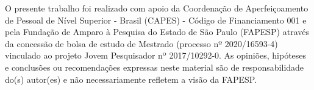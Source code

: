 \begin{agradecimentos}
O presente trabalho foi realizado com apoio da Coordenação de Aperfeiçoamento de Pessoal de Nível Superior - Brasil (CAPES) - Código de Financiamento 001 e pela Fundação de Amparo à Pesquisa do Estado de São Paulo (FAPESP) através da concessão de bolsa de estudo de Mestrado (processo nº 2020/16593-4) vinculado ao projeto Jovem Pesquisador nº 2017/10292-0. As opiniões, hipóteses e conclusões ou recomendações expressas neste material são de responsabilidade do(s) autor(es) e não necessariamente refletem a visão da FAPESP. 
\end{agradecimentos}